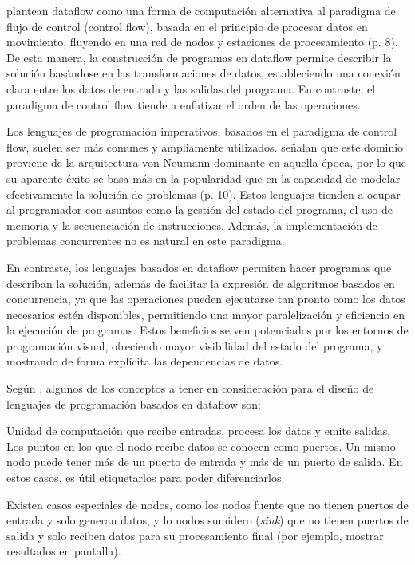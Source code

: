  plantean dataflow como una forma de computación alternativa al paradigma de flujo de control (control flow), basada en el principio de procesar datos en movimiento, fluyendo en una red de nodos y estaciones de procesamiento (p. 8). De esta manera, la construcción de programas en dataflow permite describir la solución basándose en las transformaciones de datos, estableciendo una conexión clara entre los datos de entrada y las salidas del programa. En contraste, el paradigma de control flow tiende a enfatizar el orden de las operaciones.

Los lenguajes de programación imperativos, basados en el paradigma de control flow, suelen ser más comunes y ampliamente utilizados.  señalan que este dominio proviene de la arquitectura von Neumann dominante en aquella época, por lo que su aparente éxito se basa más en la popularidad que en la capacidad de modelar efectivamente la solución de problemas (p. 10). Estos lenguajes tienden a ocupar al programador con asuntos como la gestión del estado del programa, el uso de memoria y la secuenciación de instrucciones. Además, la implementación de problemas concurrentes no es natural en este paradigma.

En contraste, los lenguajes basados en dataflow permiten hacer programas que describan la solución, además de facilitar la expresión de algoritmos basados en concurrencia, ya que las operaciones pueden ejecutarse tan pronto como los datos necesarios estén disponibles, permitiendo una mayor paralelización y eficiencia en la ejecución de programas. Estos beneficios se ven potenciados por los entornos de programación visual, ofreciendo mayor visibilidad del estado del programa, y mostrando de forma explícita las dependencias de datos.

Según , algunos de los conceptos a tener en consideración para el diseño de lenguajes de programación basados en dataflow son:


Unidad de computación que recibe entradas, procesa los datos y emite salidas. Los puntos en los que el nodo recibe datos se conocen como puertos. Un mismo nodo puede tener más de un puerto de entrada y más de un puerto de salida. En estos casos, es útil etiquetarlos para poder diferenciarlos.

Existen casos especiales de nodos, como los nodos fuente que no tienen puertos de entrada y solo generan datos, y lo nodos sumidero (\emph{sink}) que no tienen puertos de salida y solo reciben datos para su procesamiento final (por ejemplo, mostrar resultados en pantalla).

